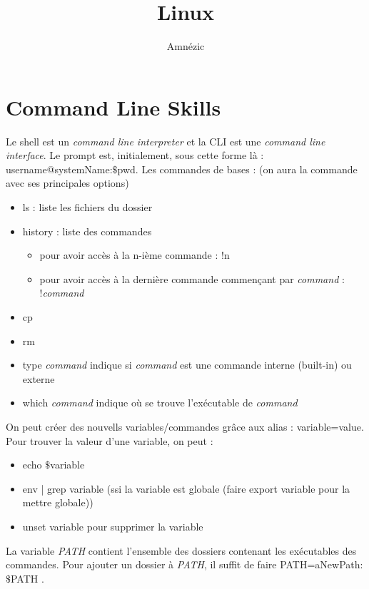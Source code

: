 \documentclass{article}
\author{Amnézic}
\date{}
\title{Linux}
\begin{document}
\maketitle
\newpage
\tableofcontents
\newpage

\section{Command Line Skills}
Le shell est un \textit{command line interpreter} et la CLI est une \textit{command line interface}.\newline
Le prompt est, initialement, sous cette forme là : username@systemName:$\$$pwd.\newline
Les commandes de bases : (on aura la commande avec ses principales options)
\begin{itemize}
    \item ls : liste les fichiers du dossier
    \item history : liste des commandes
        \begin{itemize}
            \item pour avoir accès à la n-ième commande : !n
            \item pour avoir accès à la dernière commande commençant par \textit{command} : !\textit{command}
        \end{itemize}
    \item cp
    \item rm
    \item type \textit{command} indique si \textit{command} est une commande interne (built-in) ou externe
    \item which \textit{command} indique où se trouve l'exécutable de \textit{command}
\end{itemize}

\noindent On peut créer des nouvells variables/commandes grâce aux alias : variable=value. Pour trouver la valeur d'une variable, on peut :
\begin{itemize}
    \item echo $\$$variable
    \item env | grep variable (ssi la variable est globale (faire export variable pour la mettre globale))
    \item unset variable pour supprimer la variable
\end{itemize}

\noindent La variable \textit{PATH} contient l'ensemble des dossiers contenant les exécutables des commandes. Pour ajouter un dossier à \textit{PATH}, il suffit de faire PATH=aNewPath:$\$$PATH .\newline
\end{document}

